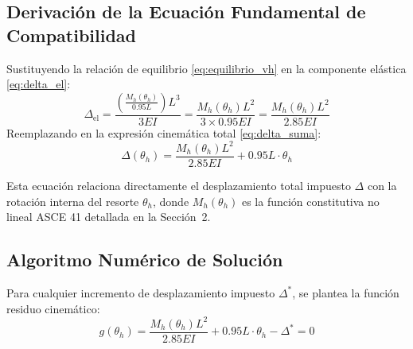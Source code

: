 \documentclass[11pt,letterpaper]{article}
\begin{document}
\subsection{Derivación de la Ecuación Fundamental de Compatibilidad}
Sustituyendo la relación de equilibrio \eqref{eq:equilibrio_vh} en la componente elástica \eqref{eq:delta_el}:
\begin{equation}
\Delta_{\text{el}} = \frac{\left(\frac{M_h(\theta_h)}{0.95 L}\right) L^3}{3 E I} = \frac{M_h(\theta_h) L^2}{3 \times 0.95 E I} = \frac{M_h(\theta_h) L^2}{2.85 E I}
\end{equation}
Reemplazando en la expresión cinemática total \eqref{eq:delta_suma}:
\begin{equation}
\Delta(\theta_h) = \frac{M_h(\theta_h) L^2}{2.85 E I} + 0.95 L \cdot \theta_h
\label{eq:delta_fundamental}
\end{equation}

Esta ecuación relaciona directamente el desplazamiento total impuesto $\Delta$ con la rotación interna del resorte $\theta_h$, donde $M_h(\theta_h)$ es la función constitutiva no lineal ASCE 41 detallada en la Sección~2.

\subsection{Algoritmo Numérico de Solución}
Para cualquier incremento de desplazamiento impuesto $\Delta^*$, se plantea la función residuo cinemático:
\begin{equation}
g(\theta_h) = \frac{M_h(\theta_h) L^2}{2.85 E I} + 0.95 L \cdot \theta_h - \Delta^* = 0
\label{eq:residuo_cinematico}
\end{equation}
\end{document}
